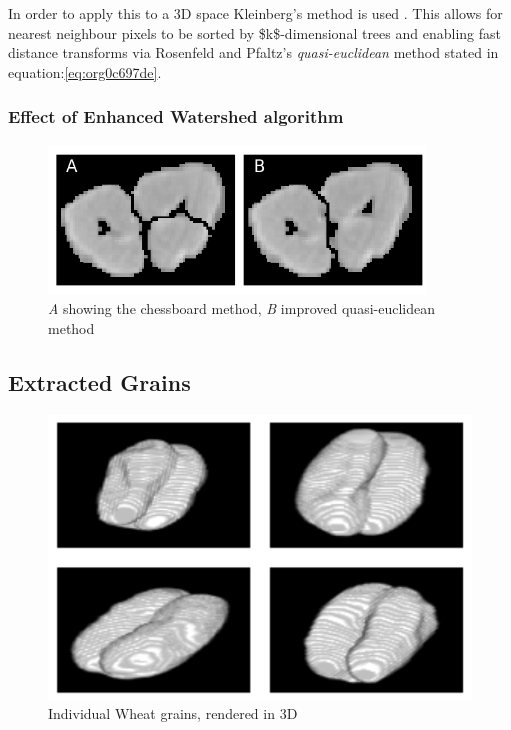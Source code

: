 \documentclass[11pt]{report}
\begin{document}
In order to apply this to a 3D space Kleinberg's method is used  \cite{Kleinberg1997}. This allows for nearest neighbour pixels to be sorted by \$k\$-dimensional trees
and enabling fast distance transforms via Rosenfeld and Pfaltz's \emph{quasi-euclidean} method stated in equation:\ref{eq:org0c697de}.
\subsubsection{Effect of Enhanced Watershed algorithm}
\label{sec:org7272019}
\begin{center}
\begin{figure}[htbp]
\centering
\includegraphics[width=10cm]{./images/chess_quasi.png}
\caption{\label{fig:orgb257c5e}
\emph{A} showing the chessboard method, \emph{B} improved quasi-euclidean method}
\end{figure}
\end{center}

\subsection{Extracted Grains}
\label{sec:orga8db955}

\begin{figure}[htbp]
\centering
\includegraphics[width=13cm]{./images/ctgrains.png}
\caption{\label{fig:org2e34380}
Individual Wheat grains, rendered in 3D}
\end{figure}
\end{document}
